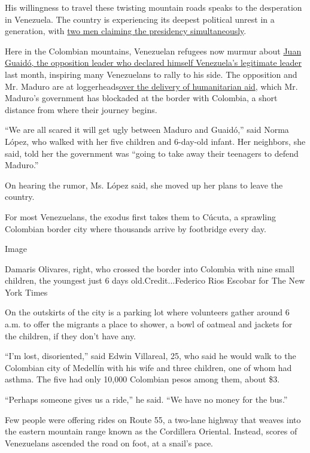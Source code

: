 His willingness to travel these twisting mountain roads speaks to the
desperation in Venezuela. The country is experiencing its deepest
political unrest in a generation, with
\href{https://www.nytimes3xbfgragh.onion/2019/02/04/world/americas/venezuela-maduro-guaido-legitimate.html}{two
men claiming the presidency simultaneously}.

Here in the Colombian mountains, Venezuelan refugees now murmur about
\href{https://www.nytimes3xbfgragh.onion/2019/01/22/world/americas/juan-guaido-facts-history-bio.html}{Juan
Guaidó, the opposition leader who declared himself Venezuela's
legitimate leader} last month, inspiring many Venezuelans to rally to
his side. The opposition and Mr. Maduro are at
loggerheads\href{https://www.nytimes3xbfgragh.onion/2019/02/13/world/americas/aid-to-venezuela.html}{over
the delivery of humanitarian aid}, which Mr. Maduro's government has
blockaded at the border with Colombia, a short distance from where their
journey begins.

``We are all scared it will get ugly between Maduro and Guaidó,'' said
Norma López, who walked with her five children and 6-day-old infant. Her
neighbors, she said, told her the government was ``going to take away
their teenagers to defend Maduro.''

On hearing the rumor, Ms. López said, she moved up her plans to leave
the country.

For most Venezuelans, the exodus first takes them to Cúcuta, a sprawling
Colombian border city where thousands arrive by footbridge every day.

Image

Damaris Olivares, right, who crossed the border into Colombia with nine
small children, the youngest just 6 days old.Credit...Federico Rios
Escobar for The New York Times

On the outskirts of the city is a parking lot where volunteers gather
around 6 a.m. to offer the migrants a place to shower, a bowl of oatmeal
and jackets for the children, if they don't have any.

``I'm lost, disoriented,'' said Edwin Villareal, 25, who said he would
walk to the Colombian city of Medellín with his wife and three children,
one of whom had asthma. The five had only 10,000 Colombian pesos among
them, about \$3.

``Perhaps someone gives us a ride,'' he said. ``We have no money for the
bus.''

Few people were offering rides on Route 55, a two-lane highway that
weaves into the eastern mountain range known as the Cordillera Oriental.
Instead, scores of Venezuelans ascended the road on foot, at a snail's
pace.

